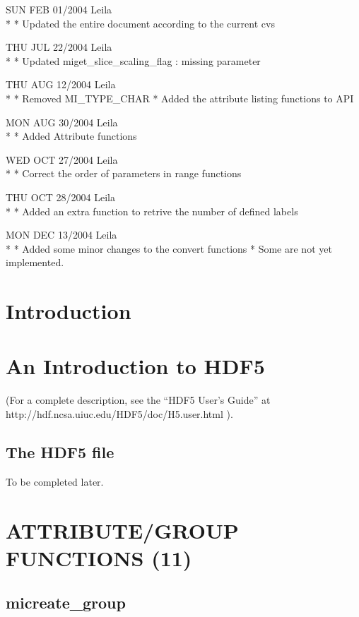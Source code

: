 \documentclass{article}
\begin{document}
SUN FEB 01/2004 Leila\\*
* Updated the entire document according to the current cvs

THU JUL 22/2004 Leila\\*
* Updated miget\_slice\_scaling\_flag : missing parameter

THU AUG 12/2004 Leila\\*
* Removed MI\_TYPE\_CHAR 
* Added the attribute listing functions to API

MON AUG 30/2004 Leila\\*
* Added Attribute functions

WED OCT 27/2004 Leila\\*
* Correct the order of parameters in range functions

THU OCT 28/2004 Leila\\*
* Added an extra function to retrive the number of defined labels

MON DEC 13/2004 Leila\\*
* Added some minor changes to the convert functions
* Some are not yet implemented. 

\section{Introduction}



\section{An Introduction to HDF5}

(For a complete description, see the ``HDF5 User's Guide''
at http://hdf.ncsa.uiuc.edu/HDF5/doc/H5.user.html ).

\subsection{The HDF5 file}

To be completed later. 

\section{ATTRIBUTE/GROUP FUNCTIONS (11)}
\subsection{micreate\_group}
\end{document}
